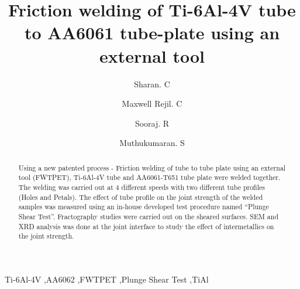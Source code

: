 \documentclass[preprint]{elsarticle}
\begin{document}
\newcommand{\degree}[1]{\ensuremath{^{\circ}}}  %



\begin{frontmatter}

\title{Friction welding of Ti-6Al-4V tube to AA6061 tube-plate using an external tool}

\author[META]{Sharan. C}
\author[META]{Maxwell Rejil. C}
\author[META]{Sooraj. R}
\author[META]{Muthukumaran. S}


\address[META]{Department of Metallurgical and Materials Engineering, National Institute of Technology, Tiruchirappalli-620015, India}
         
\begin{abstract}
Using a new patented process - Friction welding of tube to tube plate using an external tool (FWTPET), Ti-6Al-4V tube and AA6061-T651 tube plate were welded together. The welding was carried out at 4 different speeds with two different tube profiles (Holes and Petals). The effect of tube profile on the joint strength of the welded samples was measured using an in-house developed test procedure named ``Plunge Shear Test''. Fractography studies were carried out on the  sheared surfaces. SEM and XRD analysis was done at the joint interface to study the effect of intermetallics on the joint strength.
\end{abstract}

\begin{keyword}
Ti-6Al-4V \sep AA6062 \sep FWTPET \sep Plunge Shear Test \sep TiAl
\end{keyword}

\end{frontmatter}

\end{document}
